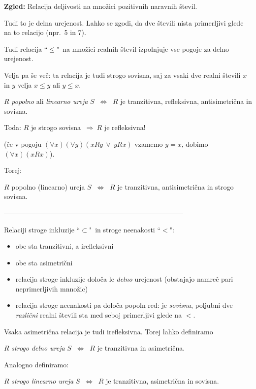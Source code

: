\documentclass[11pt,paper=b5,footinclude,headinclude]{scrbook} %
\def\ali {{~\vee~}}
\def\sledi {{~\Rightarrow~}}
\def\cee {{~\Leftrightarrow~}}
\begin{document}
\medskip
\textbf{ Zgled:} Relacija deljivosti na množici pozitivnih naravnih števil.

Tudi to je delna urejenost. Lahko se zgodi, da dve števili nista primerljivi glede na to relacijo (npr.~5 in 7).

\bigskip
Tudi relacija ``$\le$"~na množici realnih števil izpolnjuje vse pogoje za delno urejenost.

Velja pa še več: ta relacija je tudi strogo sovisna, saj za vsaki dve realni števili $x$ in $y$ velja $x\le y$ ali $y\le x$.


\bigskip

$R$ {\em popolno} ali {\em linearno ureja} $S$ $\cee$ $R$ je tranzitivna, refleksivna,
antisimetrična in  sovisna.

\bigskip
Toda: $R$ je strogo sovisna $\sledi R$ je refleksivna!

(če v pogoju $(\forall x)(\forall y)(xRy \ali yRx)$ vzamemo $y = x$, dobimo
$(\forall x)(xRx)$).

Torej:

$R$ {popolno (linearno) ureja} $S$ $\cee$ $R$ je tranzitivna, antisimetrična in strogo sovisna.

\bigskip

------------------------------------------------------------------------------


\bigskip

\newpage
Relaciji stroge inkluzije ``$\subset$"~in stroge neenakosti ``$<$":
\begin{itemize}
  \item obe sta tranzitivni, a irefleksivni
  \item obe sta asimetrični
  \item relacija stroge inkluzije določa le {\em delno} urejenost (obstajajo namreč pari neprimerljivih mnnožic)
  \item relacija stroge neenakosti pa določa popoln red: je {\em sovisna}, poljubni dve {\em različni} realni števili sta med seboj primerljivi glede na $<$.
\end{itemize}

Vsaka asimetrična relacija je tudi irefleksivna. Torej lahko definiramo

$R$ {\em strogo delno ureja} $S$ $\cee$ $R$ je tranzitivna in asimetrična.

\bigskip

Analogno definiramo:

\medskip
$R$ {\em strogo linearno ureja} $S$ $\cee$ $R$ je tranzitivna, asimetrična in sovisna.
\end{document}
